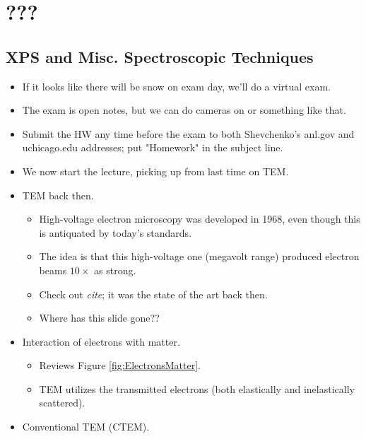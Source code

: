 \documentclass[../notes.tex]{subfiles}
\begin{document}
\chapter{???}
\section{XPS and Misc. Spectroscopic Techniques}
\begin{itemize}
    \item {}If it looks like there will be snow on exam day, we'll do a virtual exam.
    \item The exam is open notes, but we can do cameras on or something like that.
    \item Submit the HW any time before the exam to both Shevchenko's anl.gov and uchicago.edu addresses; put "Homework" in the subject line.
    \item We now start the lecture, picking up from last time on TEM.
    \item TEM back then.
    \begin{itemize}
        \item High-voltage electron microscopy was developed in 1968, even though this is antiquated by today's standards.
        \item The idea is that this high-voltage one (megavolt range) produced electron beams $10\times$ as strong.
        \item Check out \emph{cite}; it was the state of the art back then.
        \item Where has this slide gone??
    \end{itemize}
    \item Interaction of electrons with matter.
    \begin{itemize}
        \item Reviews Figure \ref{fig:ElectronsMatter}.
        \item TEM utilizes the transmitted electrons (both elastically and inelastically scattered).
    \end{itemize}
    \item Conventional TEM (CTEM).
    \begin{figure}[H]
        \centering
        \begin{subfigure}[b]{0.49\linewidth}
            \centering
\end{subfigure}
\end{figure}
\end{itemize}
\end{document}
